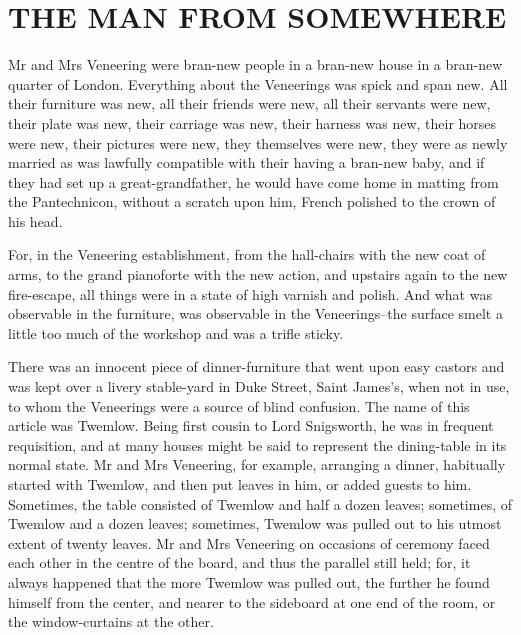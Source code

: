 
\chapter{THE MAN FROM SOMEWHERE}

Mr and Mrs Veneering were bran-new people in a bran-new house in a
bran-new quarter of London. Everything about the Veneerings was spick
and span new. All their furniture was new, all their friends were new,
all their servants were new, their plate was new, their carriage was
new, their harness was new, their horses were new, their pictures
were new, they themselves were new, they were as newly married as was
lawfully compatible with their having a bran-new baby, and if they had
set up a great-grandfather, he would have come home in matting from the
Pantechnicon, without a scratch upon him, French polished to the crown
of his head.

For, in the Veneering establishment, from the hall-chairs with the new
coat of arms, to the grand pianoforte with the new action, and upstairs
again to the new fire-escape, all things were in a state of high varnish
and polish. And what was observable in the furniture, was observable in
the Veneerings--the surface smelt a little too much of the workshop and
was a trifle sticky.

There was an innocent piece of dinner-furniture that went upon easy
castors and was kept over a livery stable-yard in Duke Street, Saint
James’s, when not in use, to whom the Veneerings were a source of blind
confusion. The name of this article was Twemlow. Being first cousin
to Lord Snigsworth, he was in frequent requisition, and at many houses
might be said to represent the dining-table in its normal state. Mr and
Mrs Veneering, for example, arranging a dinner, habitually started with
Twemlow, and then put leaves in him, or added guests to him. Sometimes,
the table consisted of Twemlow and half a dozen leaves; sometimes, of
Twemlow and a dozen leaves; sometimes, Twemlow was pulled out to his
utmost extent of twenty leaves. Mr and Mrs Veneering on occasions of
ceremony faced each other in the centre of the board, and thus the
parallel still held; for, it always happened that the more Twemlow was
pulled out, the further he found himself from the center, and nearer
to the sideboard at one end of the room, or the window-curtains at the
other.

